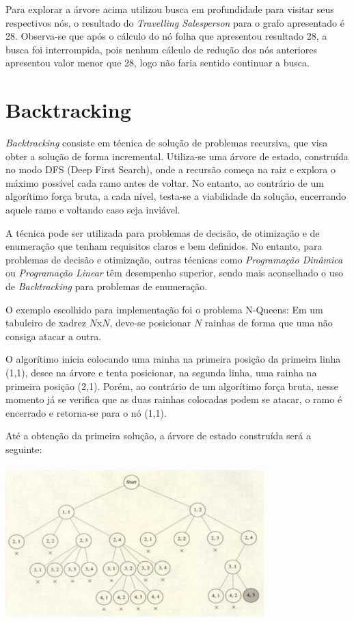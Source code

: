 \documentclass{article}
\begin{document}
Para explorar a árvore acima utilizou busca em profundidade para visitar seus respectivos nós, o resultado do \textit{Travelling Salesperson} para o grafo apresentado é 28. Observa-se que após o cálculo do nó folha que apresentou resultado 28, a busca foi interrompida, pois nenhum cálculo de redução dos nós anteriores apresentou valor menor que 28, logo não faria sentido continuar a busca. 





\section{Backtracking }
\textit{Backtracking} consiste em técnica de solução de problemas recursiva, que visa obter a solução de forma incremental. Utiliza-se uma árvore de estado, construída no modo DFS (Deep First Search), onde a recursão começa na raiz e explora o máximo possível cada ramo antes de voltar. No entanto, ao contrário de um algorítimo força bruta, a cada nível, testa-se a viabilidade da solução, encerrando aquele ramo e voltando caso seja inviável.
\par
A técnica pode ser utilizada para problemas de decisão, de otimização e de enumeração que tenham requisitos claros e bem definidos. No entanto, para problemas de decisão e otimização, outras técnicas como \textit{Programação Dinâmica} ou \textit{Programação Linear} têm desempenho superior, sendo mais aconselhado o uso de \textit{Backtracking} para problemas de enumeração.
\par
O exemplo escolhido para implementação foi o problema N-Queens: Em um tabuleiro de xadrez \(N\)x\(N\), deve-se posicionar \(N\) rainhas de forma que uma não consiga atacar a outra.
\par
O algorítimo inicia colocando uma rainha na primeira posição da primeira linha (1,1), desce na árvore e tenta posicionar, na segunda linha, uma rainha na primeira posição (2,1). Porém, ao contrário de um algorítimo força bruta, nesse momento já se verifica que as duas rainhas colocadas podem se atacar, o ramo é encerrado e retorna-se para o nó (1,1).
\par
Até a obtenção da primeira solução, a árvore de estado construída será a seguinte:

\begin{center}
\par \includegraphics[width=10cm, height=6cm]{tree.png} \par
\end{center}
\end{document}
